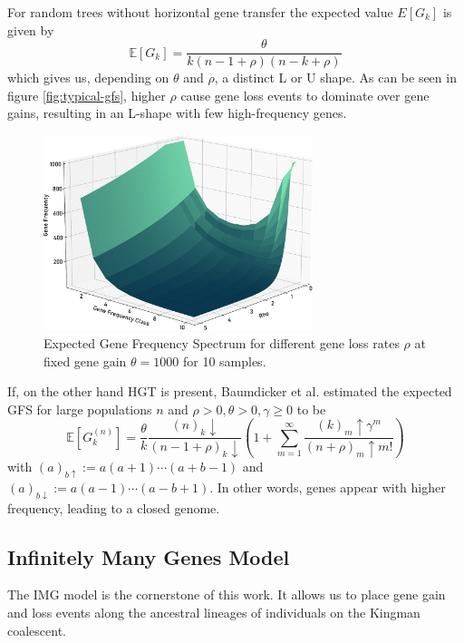 For random trees without horizontal gene transfer the expected value $E[G_k]$ is given by
\begin{equation}
      \mathbb{E}[G_k] = \frac{\theta}{k(n - 1 + \rho)(n - k + \rho)}
\end{equation}
which gives us, depending on $\theta$ and $\rho$, a distinct L or U shape.
As can be seen in figure \ref{fig:typical-gfs}, higher $\rho$ cause gene loss events to dominate over gene gains, resulting in an L-shape with few high-frequency genes.
\begin{figure}[h]
      \centering
      \includegraphics[width=0.7\textwidth]{figures/gfs_ratio.pdf}
      \caption[Expected Gene Frequency Spectrum.]{Expected Gene Frequency Spectrum for different gene loss rates $\rho$ at fixed gene gain $\theta = 1000$ for 10 samples.}
      \label{fig:egfs}
\end{figure}

If, on the other hand \ac{HGT} is present, Baumdicker et al. \cite{Baumdicker_2014} estimated the expected \ac{GFS} for large populations $n$ and $\rho > 0, \theta > 0, \gamma \geq 0$  to be
\begin{equation}
      \mathbb{E}\left[ G_k^{(n)} \right] = \frac{\theta}{k} \frac{(n)_k\downarrow}{(n-1+\rho)_k\downarrow} \left( 1 + \sum_{m=1}^{\infty} \frac{(k)_m\uparrow \gamma^m}{(n+\rho)_m\uparrow m!} \right)
\end{equation}
with $(a)_{b\uparrow} := a (a+1) \cdots (a+b-1)$ and $(a)_{b\downarrow} := a (a-1) \cdots (a-b+1)$.
In other words, genes appear with higher frequency, leading to a closed genome.

\newpage
\subsection{Infinitely Many Genes Model}
The \ac{IMG} model \cite{Baumdicker_2010} \cite{Baumdicker_2012} is the cornerstone of this work.
It allows us to place gene gain and loss events along the ancestral lineages of individuals on the Kingman coalescent.

